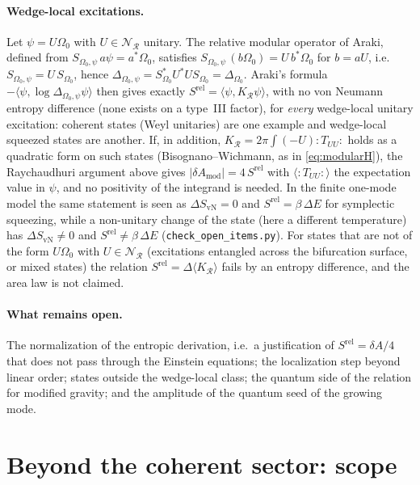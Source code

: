\documentclass[11pt]{article}
\newcommand{\Srel}{S^{\mathrm{rel}}}
\begin{document}
\paragraph{Wedge-local excitations.} Let $\psi=U\Omega_0$ with $U\in\mathscr N_{\mathcal R}$ unitary. The relative modular operator of Araki, defined from $S_{\Omega_0,\psi}\,a\psi=a^*\Omega_0$, satisfies $S_{\Omega_0,\psi}\,(b\Omega_0)=U\,b^*\Omega_0$ for $b=aU$, i.e.\ $S_{\Omega_0,\psi}=U\,S_{\Omega_0}$, hence $\Delta_{\Omega_0,\psi}=S_{\Omega_0}^*U^*US_{\Omega_0}=\Delta_{\Omega_0}$. Araki's formula $-\langle\psi,\log\Delta_{\Omega_0,\psi}\psi\rangle$ then gives exactly $\Srel=\langle\psi,K_{\mathcal R}\psi\rangle$, with no von Neumann entropy difference (none exists on a type~III factor), for \emph{every} wedge-local unitary excitation: coherent states (Weyl unitaries) are one example and wedge-local squeezed states are another. If, in addition, $K_{\mathcal R}=2\pi\int(-U){:}T_{UU}{:}$ holds as a quadratic form on such states (Bisognano--Wichmann, as in \eqref{eq:modularH}), the Raychaudhuri argument above gives $|\delta A_{\mathrm{mod}}|=4\,\Srel$ with $\langle{:}T_{UU}{:}\rangle$ the expectation value in $\psi$, and no positivity of the integrand is needed. In the finite one-mode model the same statement is seen as $\Delta S_{\mathrm{vN}}=0$ and $\Srel=\beta\,\Delta E$ for symplectic squeezing, while a non-unitary change of the state (here a different temperature) has $\Delta S_{\mathrm{vN}}\neq0$ and $\Srel\neq\beta\,\Delta E$ (\texttt{check\_open\_items.py}). For states that are not of the form $U\Omega_0$ with $U\in\mathscr N_{\mathcal R}$ (excitations entangled across the bifurcation surface, or mixed states) the relation $\Srel=\Delta\langle K_{\mathcal R}\rangle$ fails by an entropy difference, and the area law is not claimed.

\paragraph{What remains open.} The normalization of the entropic derivation, i.e.\ a justification of $\Srel=\delta A/4$ that does not pass through the Einstein equations; the localization step beyond linear order; states outside the wedge-local class; the quantum side of the relation for modified gravity; and the amplitude of the quantum seed of the growing mode.


\section{Beyond the coherent sector: scope}
\label{sec:scope}
\end{document}
